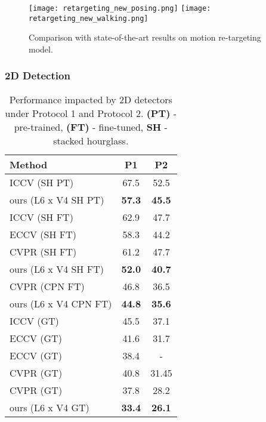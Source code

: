 \documentclass[twocolumn]{svjour3}          \smartqed  \usepackage{graphicx}
\begin{document}
\begin{figure*}
    \centering
    \texttt{[image: retargeting\_new\_posing.png]}
    \texttt{[image: retargeting\_new\_walking.png]}
    \caption{Comparison with state-of-the-art results on motion re-targeting model.}
    \label{fig:retarget-frame-wise}
\end{figure*}

\subsubsection*{\bf 2D Detection}

\begin{table}
	\begin{center}
			\begin{tabular}{l|c c}
				\toprule
				Method & P1 & P2 \\
				\midrule
				
ICCV
				\citep{Martinez2017}(SH PT) & 67.5 & 52.5\\
				ours (L6 x V4 SH PT) & \textbf{57.3} & \textbf{45.5} \\
				
               \midrule
ICCV
				\citep{Martinez2017}(SH FT) & 62.9 & 47.7 \\
ECCV
				\citep{Hossain2018}(SH FT) & 58.3 & 44.2 \\
CVPR
				\citep{Zhao2019}(SH FT) & 61.2 & 47.7\\
			    ours (L6 x V4 SH FT) & \textbf{52.0} & \textbf{40.7} \\

                \midrule
CVPR
				\citep{Pavllo2019}(CPN FT) & 46.8 & 36.5\\
				ours (L6 x V4 CPN FT) & \textbf{44.8} & \textbf{35.6}\\
				\midrule
ICCV
				\citep{Martinez2017}(GT) & 45.5 & 37.1 \\
ECCV
				\citep{Hossain2018}(GT) & 41.6 & 31.7\\
ECCV
				\citep{lee2018}(GT) & 38.4 & - \\
CVPR
				\citep{Zhao2019}(GT) & 40.8 & 31.45\\
CVPR
				\citep{Pavllo2019}(GT) & 37.8 & 28.2 \\
				ours (L6 x V4 GT) & \textbf{33.4} & \textbf{26.1 }\\
				
				\bottomrule
			\end{tabular}
	\end{center}
	\caption{Performance impacted by 2D detectors under Protocol 1 and Protocol 2. {\bf (PT)} - pre-trained, {\bf (FT)} - fine-tuned, {\bf SH} - stacked hourglass.}
	\label{tb:tb4}
\end{table}
\end{document}
